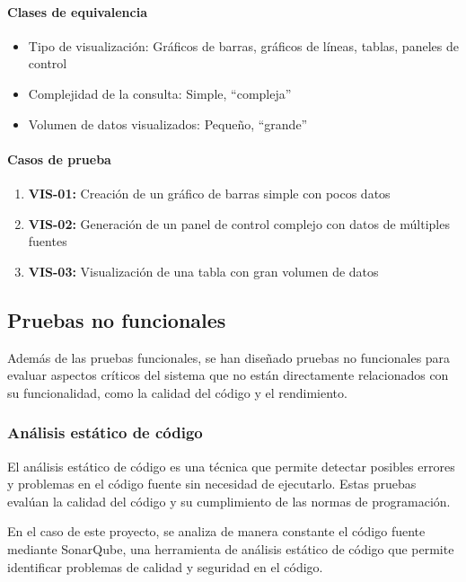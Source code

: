 \paragraph{Clases de equivalencia}
\begin{itemize}
    \item Tipo de visualización: Gráficos de barras, gráficos de líneas,
        tablas, paneles de control
    \item Complejidad de la consulta: Simple, ``compleja''
    \item Volumen de datos visualizados: Pequeño, ``grande''
\end{itemize}

\paragraph{Casos de prueba}
\begin{enumerate}
    \item \textbf{VIS-01:} Creación de un gráfico de barras simple con pocos datos
    \item \textbf{VIS-02:} Generación de un panel de control complejo con datos de múltiples fuentes
    \item \textbf{VIS-03:} Visualización de una tabla con gran volumen de datos
\end{enumerate}


\newpage{}
\subsection{Pruebas no funcionales}
Además de las pruebas funcionales, se han diseñado pruebas no funcionales para
evaluar aspectos críticos del sistema que no están directamente relacionados
con su funcionalidad, como la calidad del código y el rendimiento.

\subsubsection{Análisis estático de código}
El análisis estático de código es una técnica que permite detectar posibles
errores y problemas en el código fuente sin necesidad de ejecutarlo. Estas
pruebas evalúan la calidad del código y su cumplimiento de las normas de
programación.

En el caso de este proyecto, se analiza de manera constante el código fuente
mediante SonarQube, una herramienta de análisis estático de código que permite
identificar problemas de calidad y seguridad en el código.

